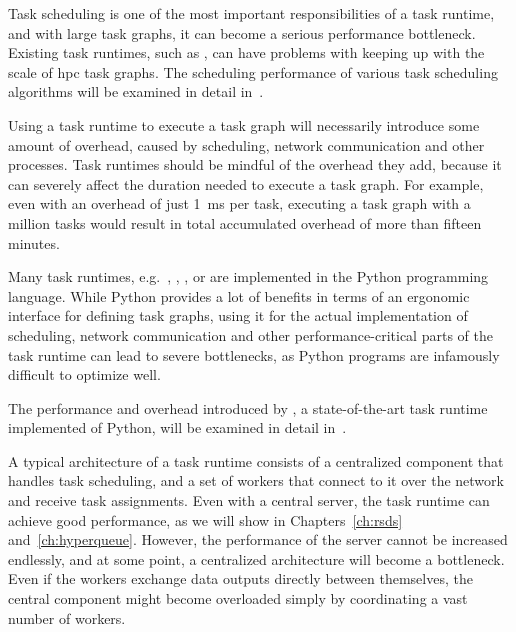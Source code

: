 \begin{description}[wide=0pt]
	\item[Scheduling] Task scheduling is one of the most important responsibilities of a task runtime, and with large
		task graphs, it can become a serious performance bottleneck. Existing task runtimes, such as
		\dask{}, can have problems with keeping up with the scale of \gls{hpc}
		task graphs. The scheduling performance of various task scheduling algorithms will be examined in
		detail in~.
	\item[Runtime overhead] Using a task runtime to execute a task graph will necessarily introduce some amount of overhead,
		caused by scheduling, network communication and other processes. Task runtimes should be mindful of
		the overhead they add, because it can severely affect the duration needed to execute a task graph.
		For example, even with an overhead of just \SI{1}{\milli\second} per task, executing a task graph
		with a million tasks would result in total accumulated overhead of more than fifteen minutes.

		Many task runtimes, e.g.\ \dask{}, \parsl{}, \balsam{},
		\autosubmit{} or \snakemake{} are implemented in the Python programming
		language. While Python provides a lot of benefits in terms of an ergonomic interface for defining
		task graphs, using it for the actual implementation of scheduling, network communication and other
		performance-critical parts of the task runtime can lead to severe bottlenecks, as Python programs
		are infamously difficult to optimize well.

		The performance and overhead introduced by \dask{}, a state-of-the-art task runtime
		implemented of Python, will be examined in detail in~.

	\item[Architecture] A typical architecture of a task runtime consists of a centralized component that handles task
		scheduling, and a set of workers that connect to it over the network and receive task assignments.
		Even with a central server, the task runtime can achieve good performance, as we will show in
		Chapters~\ref{ch:rsds} and~\ref{ch:hyperqueue}. However, the performance of the server
		cannot be increased endlessly, and at some point, a centralized architecture will become a
		bottleneck. Even if the workers exchange data outputs directly between themselves, the central
		component might become overloaded simply by coordinating a vast number of workers.


\end{description}
